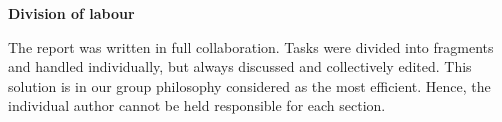 \vspace{1cm}
\begin{center}
\textbf{Division of labour}
\end{center}
\noindent
The report was written in full collaboration. Tasks were divided into
fragments and handled individually, but always discussed and collectively
edited. This solution is in our group philosophy considered as the most
efficient. Hence, the individual author cannot be held responsible for each
section.
